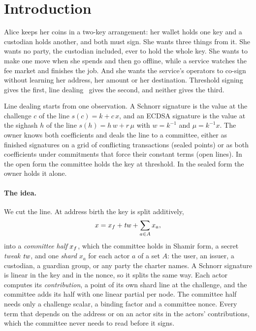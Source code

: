 \section{Introduction}\label{sec:intro}

Alice keeps her coins in a two-key arrangement: her wallet holds one key and a custodian holds another, and both must sign. She wants three things from it. She wants no party, the custodian included, ever to hold the whole key. She wants to make one move when she spends and then go offline, while a service watches the fee market and finishes the job. And she wants the service's operators to co-sign without learning her address, her amount or her destination. Threshold signing gives the first, line dealing~\cite{LD} gives the second, and neither gives the third.

Line dealing starts from one observation. A Schnorr signature is the value at the challenge $c$ of the line $s(c) = k + c\,x$, and an ECDSA signature is the value at the sighash $h$ of the line $s(h) = h\,w + r\,\mu$ with $w = k^{-1}$ and $\mu = k^{-1}x$. The owner knows both coefficients and deals the line to a committee, either as finished signatures on a grid of conflicting transactions (sealed points) or as both coefficients under commitments that force their constant terms (open lines). In the open form the committee holds the key at threshold. In the sealed form the owner holds it alone.

\paragraph{The idea.} We cut the line. At address birth the key is split additively,
\[
  x = x_{f} + \mathit{tw} + \sum_{a \in A} x_a ,
\]
into a \emph{committee half} $x_{f}$, which the committee holds in Shamir form, a secret \emph{tweak} $\mathit{tw}$, and one \emph{shard} $x_a$ for each actor $a$ of a set $A$: the user, an issuer, a custodian, a guardian group, or any party the charter names. A Schnorr signature is linear in the key and in the nonce, so it splits the same way. Each actor computes its \emph{contribution}, a point of its own shard line at the challenge, and the committee adds its half with one linear partial per node. The committee half needs only a challenge scalar, a binding factor and a committee nonce. Every term that depends on the address or on an actor sits in the actors' contributions, which the committee never needs to read before it signs.

